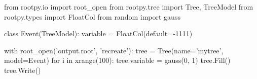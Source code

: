 \begin{footnotesize}
\begin{pyglist}[language=python,texcl=true,abovecaptionskip=0,style=vs,bgcolor=Moccasin]
from rootpy.io import root_open
from rootpy.tree import Tree, TreeModel
from rootpy.types import FloatCol
from random import gauss

class Event(TreeModel):
    variable = FloatCol(default=-1111)

with root_open('output.root', 'recreate'):
    tree = Tree(name='mytree', model=Event)
    for i in xrange(100):
        tree.variable = gauss(0, 1)
        tree.Fill()
    tree.Write()
\end{pyglist}
\end{footnotesize}
